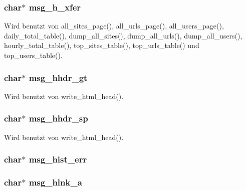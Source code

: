 \subsubsection{\setlength{\rightskip}{0pt plus 5cm}char$\ast$ {\bf msg\_\-h\_\-xfer}}\label{lang_8h_b193be580f6d1d61bb87dfb4e9f8547c}




Wird benutzt von all\_\-sites\_\-page(), all\_\-urls\_\-page(), all\_\-users\_\-page(), daily\_\-total\_\-table(), dump\_\-all\_\-sites(), dump\_\-all\_\-urls(), dump\_\-all\_\-users(), hourly\_\-total\_\-table(), top\_\-sites\_\-table(), top\_\-urls\_\-table() und top\_\-users\_\-table().
\subsubsection{\setlength{\rightskip}{0pt plus 5cm}char$\ast$ {\bf msg\_\-hhdr\_\-gt}}\label{lang_8h_2b9f2f69e665448e249b8ce01055196e}




Wird benutzt von write\_\-html\_\-head().
\subsubsection{\setlength{\rightskip}{0pt plus 5cm}char$\ast$ {\bf msg\_\-hhdr\_\-sp}}\label{lang_8h_3d3b7751d6e494d468adb748ca65167c}




Wird benutzt von write\_\-html\_\-head().
\subsubsection{\setlength{\rightskip}{0pt plus 5cm}char$\ast$ {\bf msg\_\-hist\_\-err}}\label{lang_8h_78b4e52380a3d91b131c074eea130b82}


\subsubsection{\setlength{\rightskip}{0pt plus 5cm}char$\ast$ {\bf msg\_\-hlnk\_\-a}}\label{lang_8h_63bc4c24fa58aadfe6b07847a5385727}




